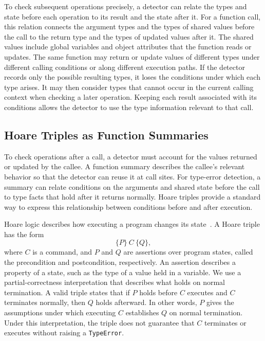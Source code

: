 To check subsequent operations precisely, a detector can relate the types
and state before each operation to its result and the state after it.
For a function call, this relation connects the argument types and the
types of shared values before the call to the return type and the types
of updated values after it. The shared values include global variables
and object attributes that the function reads or updates.
The same function may return or update values of different types under
different calling conditions or along different execution paths. If the
detector records only the possible resulting types, it loses the
conditions under which each type arises. It may then consider types that
cannot occur in the current calling context when checking a later
operation. Keeping each result associated with its conditions allows the
detector to use the type information relevant to that call.

\subsection{Hoare Triples as Function Summaries}
\label{sec:hoare-background}

To check operations after a call, a detector must account for the values
returned or updated by the callee. A function summary describes the
callee's relevant behavior so that the detector can reuse it at call
sites. For type-error detection, a summary can relate conditions on the
arguments and shared state before the call to type facts that hold after
it returns normally. Hoare triples provide a standard way to express
this relationship between conditions before and after execution.

Hoare logic describes how executing a program changes its
state~\cite{hoare1969axiomatic,softwareFoundationsHoare}. A Hoare triple has
the form
\begin{equation}
\{P\}\ C\ \{Q\},
\label{eq:hoare-triple}
\end{equation}
where $C$ is a command, and $P$ and $Q$ are assertions over program states,
called the precondition and postcondition, respectively. An assertion
describes a property of a state, such as the type of a value held in a
variable.
We use a partial-correctness interpretation that describes what holds on
normal termination. A valid triple states that if $P$ holds before $C$
executes and $C$ terminates normally, then $Q$ holds afterward. In other
words, $P$ gives the assumptions under which executing $C$ establishes $Q$
on normal termination. Under this interpretation, the triple does not
guarantee that $C$ terminates or executes without raising a
\texttt{TypeError}.

